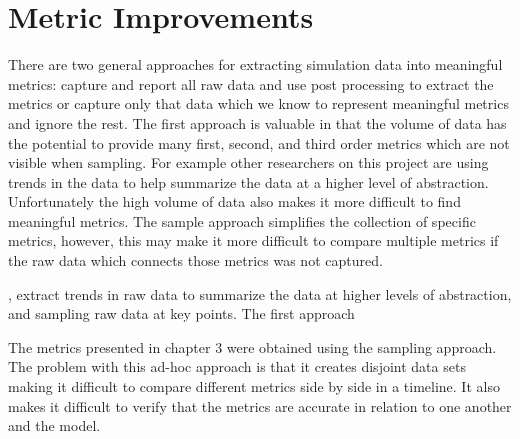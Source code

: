 \chapter{Metric Improvements}

There are two general approaches for extracting simulation data into meaningful metrics: capture and report all raw data and use post processing to extract the metrics or capture only that data which we know to represent meaningful metrics and ignore the rest.  The first approach is valuable in that the volume of data has the potential to provide many first, second, and third order metrics which are not visible when sampling.  For example other researchers on this project are using trends in the data to help summarize the data at a higher level of abstraction.  Unfortunately the high volume of data also makes it more difficult to find meaningful metrics.  The sample approach simplifies the collection of specific metrics, however, this may make it more difficult to compare multiple metrics if the raw data which connects those metrics was not captured.    

 , extract trends in raw data to summarize the data at higher levels of abstraction, and sampling raw data at key points.  The first approach

The metrics presented in chapter 3 were obtained using the sampling approach.  The problem with this ad-hoc approach is that it creates disjoint data sets making it difficult to compare different metrics side by side in a timeline.  It also makes it difficult to verify that the metrics are accurate in relation to one another and the model.


